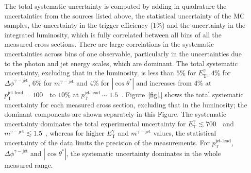 \documentclass[cernpreprint,texlive=2016,txfonts,UKenglish]{latex/atlasdoc}
\def\ptjetl{p_{\mathrm{T}}^{\text{jet-lead}}}
\def\etg{E_{\mathrm{T}}^{\gamma}}
\def\mgj{m^{\gamma-{\mathrm{jet}}}}
\def\ctgj{\cos\theta^*}
\def\deltaphigj{\Delta\phi^{\gamma-{\mathrm{jet}}}}
\begin{document}
The total systematic uncertainty is computed by adding in quadrature
the uncertainties from the sources listed above, the statistical
uncertainty of the MC samples, the uncertainty in the trigger
efficiency ($1\%$) and the uncertainty in the integrated luminosity,
which is fully correlated between all bins of all the measured cross
sections. There are large correlations in the systematic uncertainties
across bins of one observable, particularly in the uncertainties due
to the photon and jet energy scales, which are dominant. The total
systematic uncertainty, excluding that in the luminosity, is less than
$5\%$ for $\etg$, $4\%$ for $\deltaphigj$, $6\%$ for $\mgj$ and $4\%$
for $|\ctgj|$ and increases from $4\%$ at $\ptjetl=100$~\GeV\ to
$10\%$ at $\ptjetl\sim 1.5$~\TeV. Figure~\ref{fig1} shows the total
systematic uncertainty  for each measured cross section, excluding
that in the luminosity; the dominant components are shown separately
in this Figure. The systematic uncertainty dominates the total
experimental uncertainty for $\etg\lesssim 700$~\GeV\ and
$\mgj\lesssim 1.5$~\TeV, whereas for higher $\etg$ and $\mgj$ values,
the statistical uncertainty of the data limits the precision of the
measurements. For $\ptjetl$, $\deltaphigj$ and $|\ctgj|$, the
systematic uncertainty dominates in the whole measured range.
\end{document}
